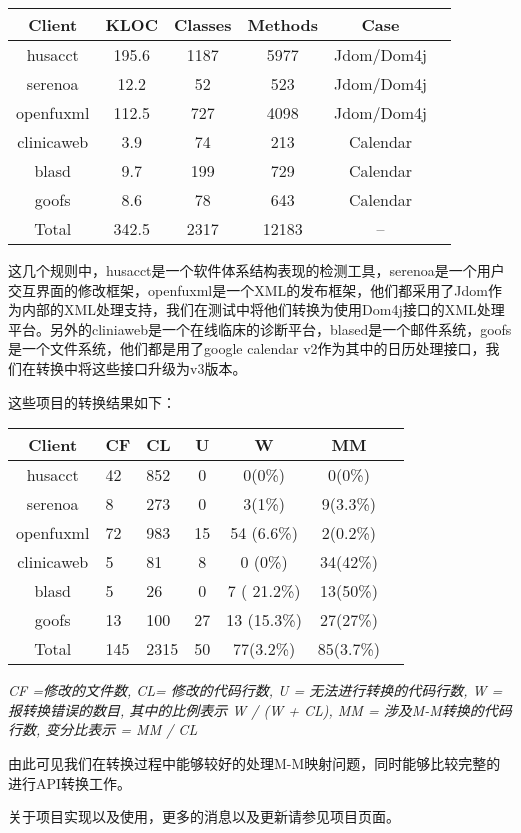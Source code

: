 \begin{center}
    \begin{tabular}{|c|c|c|c|c|c|}
        \hline
        Client & KLOC & Classes & Methods  & Case\\
        \hline \hline
        husacct & 195.6 & 1187  & 5977 & Jdom/Dom4j \\
        \hline
        serenoa & 12.2  & 52 & 523 & Jdom/Dom4j \\
        \hline
        openfuxml & 112.5 & 727 & 4098 & Jdom/Dom4j \\
        \hline
        clinicaweb & 3.9 & 74  & 213 & Calendar \\
        \hline
        blasd & 9.7 & 199 & 729 & Calendar  \\
        \hline
        goofs & 8.6 & 78 & 643 & Calendar  \\
      \hline
      \hline
      Total & 342.5 & 2317 & 12183 & --\\
      \hline
    \end{tabular}
\end{center}

这几个规则中，husacct是一个软件体系结构表现的检测工具，serenoa是一个用户交互界面的修改框架，openfuxml是一个XML的发布框架，他们都采用了Jdom作为内部的XML处理支持，我们在测试中将他们转换为使用Dom4j接口的XML处理平台。另外的cliniaweb是一个在线临床的诊断平台，blased是一个邮件系统，goofs是一个文件系统，他们都是用了google calendar v2作为其中的日历处理接口，我们在转换中将这些接口升级为v3版本。

这些项目的转换结果如下：

\begin{center}
    \begin{tabular}{|c|p{}|p{}|c|c|c|c|}
        \hline
        Client & CF & CL & U & W & MM \\
        \hline \hline
        husacct     & 42 & 852 & 0& 0(0\%) & 0(0\%)\\
        \hline
        serenoa     & 8 & 273 & 0& 3(1\%) & 9(3.3\%) \\
        \hline
        openfuxml   & 72 & 983 & 15 &  54 (6.6\%) & 2(0.2\%) \\
        \hline
        clinicaweb  & 5 & 81 & 8 & 0 (0\%) & 34(42\%) \\
        \hline
        blasd      & 5 & 26 &0& 7 ( 21.2\%) & 13(50\%) \\
        \hline
        goofs      & 13 & 100 & 27 & 13 (15.3\%) & 27(27\%) \\
      \hline
      \hline
      Total & 145 & 2315 & 50 & 77(3.2\%) & 85(3.7\%) \\ 
      \hline
    \end{tabular}
    \parbox{\columnwidth}{\it 
    CF =修改的文件数, CL= 修改的代码行数, U =
    无法进行转换的代码行数, W = 报转换错误的数目,
    其中的比例表示 W / (W + CL), 
    MM = 涉及M-M转换的代码行数,
  变分比表示 = MM / CL}
\end{center}

由此可见我们在转换过程中能够较好的处理M-M映射问题，同时能够比较完整的进行API转换工作。

关于项目实现以及使用，更多的消息以及更新请参见项目页面。